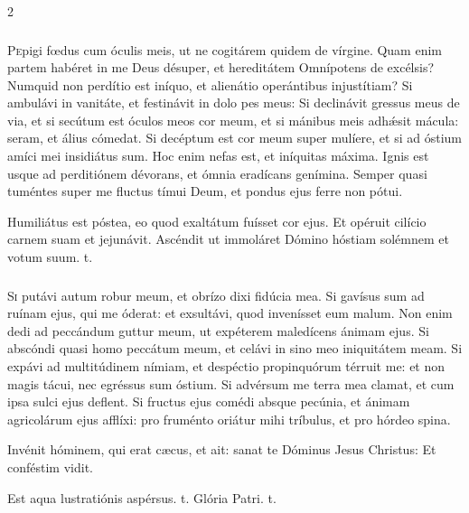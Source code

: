 \documentclass[9pt,twoside]{extarticle}
\begin{document}
\begin{multicols}{2}
\subsubsection*{\center{}}
\lettrine{P}epigi fœdus cum óculis meis, ut ne cogitárem quidem de vírgine. Quam enim partem habéret in me Deus désuper, et hereditátem Omnípotens de excélsis? Numquid non perdítio est iníquo, et alienátio operántibus injustítiam? Si ambulávi in vanitáte, et festinávit in dolo pes meus: Si declinávit gressus meus de via, et si secútum est óculos meos cor meum, et si mánibus meis adhǽsit mácula: seram, et álius cómedat. Si decéptum est cor meum super mulíere, et si ad óstium amíci mei insidiátus sum. Hoc enim nefas est, et iníquitas máxima. Ignis est usque ad perditiónem dévorans, et ómnia eradícans genímina. Semper quasi tuméntes super me fluctus tímui Deum, et pondus ejus ferre non pótui. 

\begin{tightlist}{}
\item {} Humiliátus est póstea, eo quod exaltátum fuísset cor ejus. \textred{*} Et opéruit cilício carnem suam et jejunávit.  Ascéndit ut immoláret Dómino hóstiam solémnem et votum suum. t.
\end{tightlist}

\subsubsection*{\center {}}
\lettrine{S}i putávi autum robur meum, et obrízo dixi fidúcia mea. Si gavísus sum ad ruínam ejus, qui me óderat: et exsultávi, quod invenísset eum malum. Non enim dedi ad peccándum guttur meum, ut expéterem maledícens ánimam ejus. Si abscóndi quasi homo peccátum meum, et celávi in sino meo iniquitátem meam. Si expávi ad multitúdinem nímiam, et despéctio propinquórum térruit me: et non magis tácui, nec egréssus sum óstium. Si advérsum me terra mea clamat, et cum ipsa sulci ejus deflent. Si fructus ejus comédi absque pecúnia, et ánimam agricolárum ejus afflíxi: pro fruménto oriátur mihi tríbulus, et pro hórdeo spina. 

\begin{tightlist}{}
\item {} Invénit hóminem, qui erat cæcus, et ait: sanat te Dóminus Jesus Christus: \textred{*} Et conféstim vidit. 
\item {} Est aqua lustratiónis aspérsus. t. Glória Patri. t.
\end{tightlist}


\end{multicols}
\end{document}
